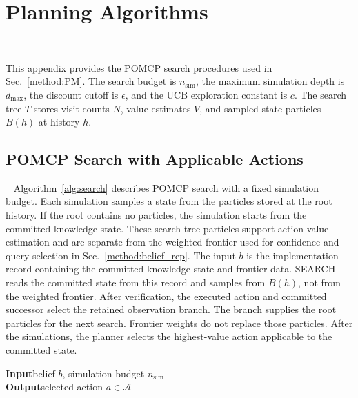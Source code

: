 \section{Planning Algorithms}~\label{appx:algorithms}

This appendix provides the POMCP search procedures used in Sec.~\ref{method:PM}. The search budget is $n_{\mathrm{sim}}$, the maximum simulation depth is $d_{\max}$, the discount cutoff is $\epsilon$, and the UCB exploration constant is $c$. The search tree $T$ stores visit counts $N$, value estimates $V$, and sampled state particles $B(h)$ at history $h$.

\normalem
\subsection{POMCP Search with Applicable Actions}~\label{appx:alg_search}
Algorithm~\ref{alg:search} describes POMCP search with a fixed simulation budget. Each simulation samples a state from the particles stored at the root history. If the root contains no particles, the simulation starts from the committed knowledge state. These search-tree particles support action-value estimation and are separate from the weighted frontier used for confidence and query selection in Sec.~\ref{method:belief_rep}. The input $b$ is the implementation record containing the committed knowledge state and frontier data. SEARCH reads the committed state from this record and samples from $B(h)$, not from the weighted frontier. After verification, the executed action and committed successor select the retained observation branch. The branch supplies the root particles for the next search. Frontier weights do not replace those particles. After the simulations, the planner selects the highest-value action applicable to the committed state.

\begin{algorithm}[H]
\caption{POMCP Search with Applicable Actions}
\label{alg:search}
\textbf{Input}\quad belief $b$, simulation budget $n_{\mathrm{sim}}$ \\
\textbf{Output}\quad selected action $a \in \mathcal{A}$
\BlankLine

\end{algorithm}

